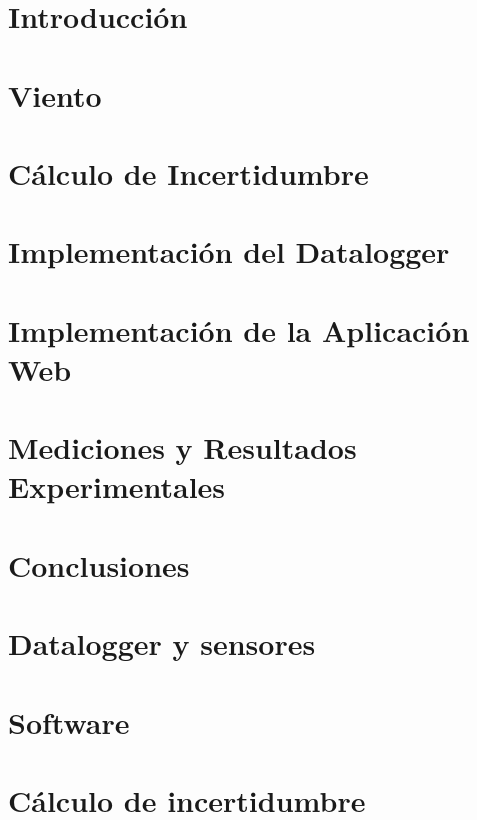 \documentclass[11pt, a4paper,oneside]{book}
\begin{document}


\clearpage\hbox{}\thispagestyle{empty}\newpage

\clearpage\hbox{}\thispagestyle{empty}\newpage

\clearpage\hbox{}\thispagestyle{empty}\newpage

\clearpage\hbox{}\thispagestyle{empty}\newpage
\tableofcontents
\listoffigures
\listoftables
\newpage

\setcounter{page}{1}

\chapter{Introducción}\label{cap:introduccion}

\chapter{Viento}\label{cap:viento}

\chapter{Cálculo de Incertidumbre}\label{cap:incertidumbre}

\chapter{Implementación del Datalogger}\label{cap:datalogger}

\chapter{Implementación de la Aplicación Web}\label{cap:aplicacionweb}

\chapter{Mediciones y Resultados Experimentales}\label{cap:med_result}

\chapter{Conclusiones}



\appendix
\chapter{Datalogger y sensores}

\chapter{Software}

\chapter{Cálculo de incertidumbre}

\printbibliography
\end{document}
